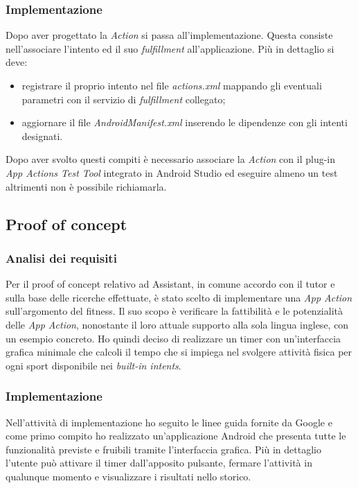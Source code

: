 		\subsubsection{Implementazione}
		Dopo aver progettato la \emph{Action} si passa all'implementazione. Questa consiste nell'associare l'intento ed il suo \emph{fulfillment} all'applicazione. Più in dettaglio si deve:
		\begin{itemize}
			\item registrare il proprio intento nel file \emph{actions.xml} mappando gli eventuali parametri con il servizio di \emph{fulfillment} collegato;
			\item aggiornare il file \emph{AndroidManifest.xml} inserendo le dipendenze con gli intenti designati.
		\end{itemize}
		Dopo aver svolto questi compiti è necessario associare la \emph{Action} con il plug-in \emph{App Actions Test Tool} integrato in Android Studio ed eseguire almeno un test altrimenti non è possibile richiamarla.
	\subsection{Proof of concept}
		\subsubsection{Analisi dei requisiti}
		Per il proof of concept relativo ad Assistant, in comune accordo con il tutor e sulla base delle ricerche effettuate, è stato scelto di implementare una \emph{App Action} sull'argomento del fitness. Il suo scopo è verificare la fattibilità e le potenzialità delle \emph{App Action}, nonostante il loro attuale supporto alla sola lingua inglese, con un esempio concreto.
		Ho quindi deciso di realizzare un timer con un'interfaccia grafica minimale che calcoli il tempo che si impiega nel svolgere attività fisica per ogni sport disponibile nei \emph{built-in intents}.
		\subsubsection{Implementazione}	\mbox{}
		Nell'attività di implementazione ho seguito le linee guida fornite da Google e come primo compito ho realizzato un'applicazione Android che presenta tutte le funzionalità previste e fruibili tramite l'interfaccia grafica. Più in dettaglio l'utente può attivare il timer dall'apposito pulsante, fermare l'attività in qualunque momento e visualizzare i risultati nello storico. 
		
